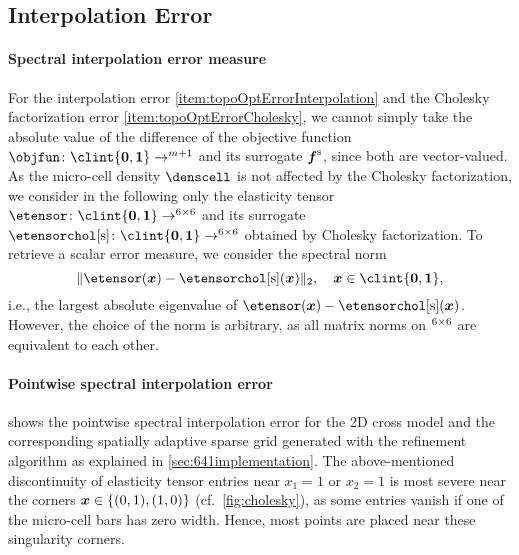 \subsection{Interpolation Error}
\label{sec:643interpolation}

\paragraph{Spectral interpolation error measure}

For the interpolation error \ref{item:topoOptErrorInterpolation} and
the Cholesky factorization error \ref{item:topoOptErrorCholesky},
we cannot simply take the absolute value of the difference
of the objective function $\*\objfun\colon \clint{\*0, \*1} \to \real^{m+1}$
and its surrogate $\vsgintp$, since both are vector-valued.
As the micro-cell density $\denscell$
is not affected by the Cholesky factorization,
we consider in the following only the elasticity tensor
$\etensor\colon \clint{\*0, \*1} \to \real^{6 \times 6}$ and
its surrogate
$\etensorcholintp\colon \clint{\*0, \*1} \to \real^{6 \times 6}$
obtained by Cholesky factorization.
To retrieve a scalar error measure,
we consider the spectral norm
\begin{equation}
  \norm[2]{\etensor(\*x) - \etensorcholintp(\*x)},\quad
  \*x \in \clint{\*0, \*1},
\end{equation}
i.e., the largest absolute eigenvalue of
$\etensor(\*x) - \etensorcholintp(\*x)$.
However, the choice of the norm is arbitrary,
as all matrix norms on $\real^{6 \times 6}$ are equivalent to each other.

\paragraph{Pointwise spectral interpolation error}

shows the pointwise spectral interpolation error for the 2D cross model
and the corresponding spatially adaptive sparse grid
generated with the refinement algorithm as explained in
\cref{sec:641implementation}.
The above-mentioned discontinuity of elasticity tensor entries
near $x_1 = 1$ or $x_2 = 1$
is most severe near the corners ${\boldsymbol{x}} \in \{(0, 1), (1, 0)\}$
(cf.\ \cref{fig:cholesky}),
as some entries vanish if one of the micro-cell bars has zero width.
Hence, most points are placed near these singularity corners.

